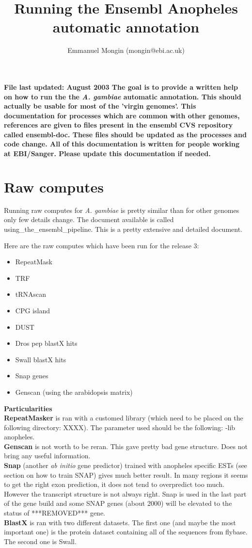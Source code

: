 \documentclass[a4paper,10pt]{article}
\title{Running the Ensembl Anopheles automatic annotation}
\author{Emmanuel Mongin (mongin@ebi.ac.uk)}
\begin{document}
\maketitle


\bf{File last updated: August 2003}
The goal is to provide a written help on how to run the the \textit{A. gambiae} automatic annotation. This should actually be usable for most of the 'virgin genomes'. This documentation for processes which are common with other genomes, references are given to files present in the ensembl CVS repository called ensembl-doc. These files should be updated as the processes and code change. All of this documentation is written for people working at EBI/Sanger. Please update this documentation if needed. 

\section{Raw computes}
Running raw computes for \textit{A. gambiae} is pretty similar than for other genomes only few details change.
The document available is called using\_the\_ensembl\_pipeline. This is a pretty extensive and detailed document.

Here are the raw computes which have been run for the release 3:
\begin{itemize}
\item RepeatMask
\item TRF
\item tRNAscan
\item CPG island
\item DUST
\item Dros pep blastX hits
\item Swall blastX hits
\item Snap genes
\item Genscan (using the arabidopsis matrix)
\end{itemize}

\textbf{Particularities}\\
\textbf{RepeatMasker} is ran with a customed library (which need to be placed on the following directory: XXXX). The parameter used should be the following: \--lib anopheles.\\
\textbf{Genscan} is not worth to be reran. This gave pretty bad gene structure. Does not bring any useful information.\\
\textbf{Snap} (another \textit{ab initio} gene predictor) trained with anopheles specific ESTs (see section on how to train SNAP) gives much better result. In many regions it seems to get the right exon prediction, it does not tend to overpredict too much. However the transcript structure is not always right. Snap is used in the last part of the gene build and some SNAP genes (about 2000) will be elevated to the status of ***REMOVED*** gene.\\
\textbf{BlastX} is ran with two different datasets. The first one (and maybe the most important one) is the protein dataset containing all of the sequences from flybase. The second one is Swall.\\
\end{document}
